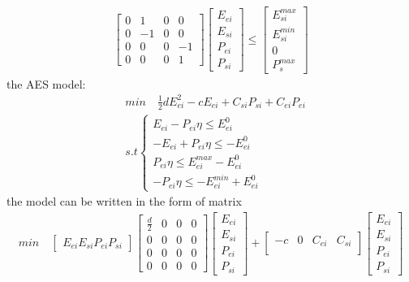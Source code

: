 \documentclass[11pt]{article} %
\begin{document}
\begin{align} 
    \begin{bmatrix}
        0 & 1 & 0 & 0\\
        0 & -1 & 0 & 0\\
        0 & 0 & 0 & -1\\
        0 & 0 & 0 & 1
    \end{bmatrix} 
    \begin{bmatrix}
        E_{ei}\\
        E_{si}\\
        P_{ei}\\
        P_{si}
    \end{bmatrix} \leq
    \begin{bmatrix}
        E_{si}^{max}\\
        E_{si}^{min}\\
        0\\
        P_{s}^{max}
    \end{bmatrix}
\end{align}
the AES model:
\begin{align}  
    &min \quad \frac{1}{2}dE_{ei}^2 -cE_{ei} + C_{si}P_{si} +  C_{ei}P_{ei}\nonumber\\
    &s.t \begin{cases}
        E_{ei} - P_{ei}\eta \leq E_{ei}^{0}\\
         -E_{ei} + P_{ei}\eta \leq -E_{ei}^{0}\\
         P_{ei} \eta  \leq E_{ei}^{max} - E_{ei}^0 \\
         -P_{ei}  \eta \leq -E_{ei}^{min} + E_{ei}^0  
        \end{cases}
\end{align}
the model can be written in the form of matrix
\begin{align} 
    min \quad
    \begin{bmatrix}
        E_{ei}
        E_{si}
        P_{ei}
        P_{si}
    \end{bmatrix} 
    \begin{bmatrix}
        \frac{d}{2} & 0 & 0 & 0\\
        0 & 0  & 0 & 0\\
        0 & 0 & 0 & 0\\
        0 & 0 & 0 & 0
    \end{bmatrix} 
    \begin{bmatrix}
        E_{ei}\\
        E_{si}\\
        P_{ei}\\
        P_{si}
    \end{bmatrix} +
    \begin{bmatrix}
        -c & 0 & C_{ei} & C_{si}\\
    \end{bmatrix} 
    \begin{bmatrix}
        E_{ei}\\
        E_{si}\\
        P_{ei}\\
        P_{si}
    \end{bmatrix}
\end{align}
\end{document}
